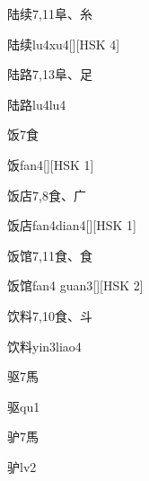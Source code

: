 \begin{entry}{陆续}{7,11}{⾩、⽷}
  \begin{phonetics}{陆续}{lu4xu4}[][HSK 4]
  \end{phonetics}
\end{entry}

\begin{entry}{陆路}{7,13}{⾩、⾜}
  \begin{phonetics}{陆路}{lu4lu4}
  \end{phonetics}
\end{entry}

\begin{entry}{饭}{7}{⾷}
  \begin{phonetics}{饭}{fan4}[][HSK 1]
  \end{phonetics}
\end{entry}

\begin{entry}{饭店}{7,8}{⾷、⼴}
  \begin{phonetics}{饭店}{fan4dian4}[][HSK 1]
  \end{phonetics}
\end{entry}

\begin{entry}{饭馆}{7,11}{⾷、⾷}
  \begin{phonetics}{饭馆}{fan4 guan3}[][HSK 2]
  \end{phonetics}
\end{entry}

\begin{entry}{饮料}{7,10}{⾷、⽃}
  \begin{phonetics}{饮料}{yin3liao4}
  \end{phonetics}
\end{entry}

\begin{entry}{驱}{7}{⾺}
  \begin{phonetics}{驱}{qu1}
  \end{phonetics}
\end{entry}

\begin{entry}{驴}{7}{⾺}
  \begin{phonetics}{驴}{lv2}
  \end{phonetics}
\end{entry}

